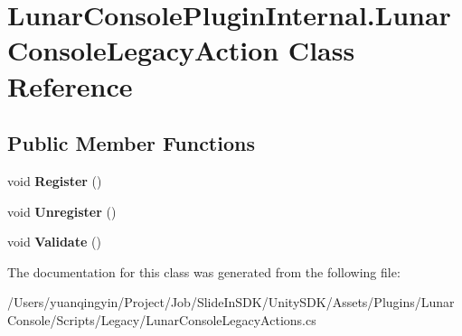 \hypertarget{class_lunar_console_plugin_internal_1_1_lunar_console_legacy_action}{}\section{Lunar\+Console\+Plugin\+Internal.\+Lunar\+Console\+Legacy\+Action Class Reference}
\label{class_lunar_console_plugin_internal_1_1_lunar_console_legacy_action}
\subsection*{Public Member Functions}
\begin{DoxyCompactItemize}
\item 
\mbox{\label{class_lunar_console_plugin_internal_1_1_lunar_console_legacy_action_a104db5dadb178667c0f07851eeea8f41}} 
void {\bfseries Register} ()
\item 
\mbox{\label{class_lunar_console_plugin_internal_1_1_lunar_console_legacy_action_a600674c1af9838110acee1c893e17e74}} 
void {\bfseries Unregister} ()
\item 
\mbox{\label{class_lunar_console_plugin_internal_1_1_lunar_console_legacy_action_a86b82d9e6bd91be8409e3effeef168de}} 
void {\bfseries Validate} ()
\end{DoxyCompactItemize}


The documentation for this class was generated from the following file\+:\begin{DoxyCompactItemize}
\item 
/\+Users/yuanqingyin/\+Project/\+Job/\+Slide\+In\+S\+D\+K/\+Unity\+S\+D\+K/\+Assets/\+Plugins/\+Lunar\+Console/\+Scripts/\+Legacy/Lunar\+Console\+Legacy\+Actions.\+cs\end{DoxyCompactItemize}
